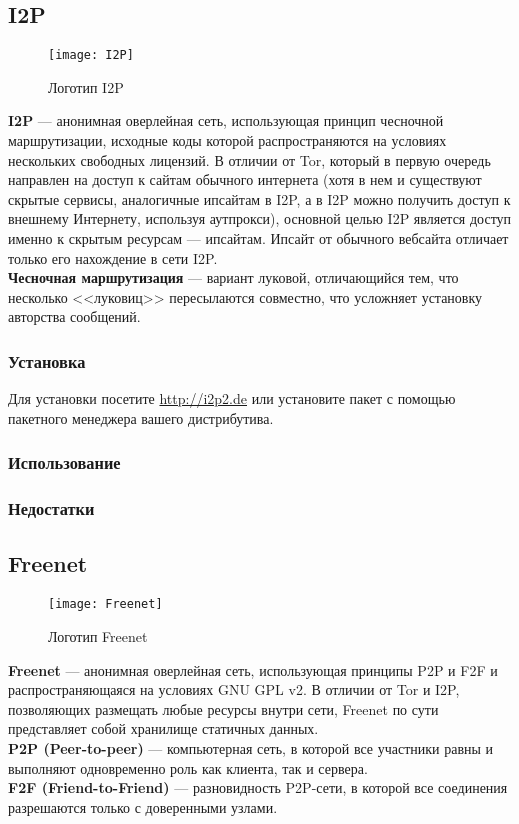 \subsection{I2P}
\begin{wrapfigure}[6]{r}{0.25\linewidth}
\texttt{[image: I2P]}
\caption{Логотип I2P}
\end{wrapfigure}
\textbf{I2P} --- анонимная оверлейная сеть, использующая принцип чесночной маршрутизации, исходные коды которой распространяются на условиях нескольких свободных лицензий\cite{i2p_license}. В отличии от Tor, который в первую очередь направлен на доступ к сайтам обычного интернета (хотя в нем и существуют скрытые сервисы, аналогичные ипсайтам в I2P, а в I2P можно получить доступ к внешнему Интернету, используя аутпрокси), основной целью I2P является доступ именно к скрытым ресурсам --- ипсайтам. Ипсайт от обычного вебсайта отличает только его нахождение в сети I2P.\\
\textbf{Чесночная маршрутизация} --- вариант луковой, отличающийся тем, что несколько <<луковиц>> пересылаются совместно, что усложняет установку авторства сообщений.
\subsubsection{Установка}
Для установки посетите \url{http://i2p2.de} или установите пакет с помощью пакетного менеджера вашего дистрибутива.
\subsubsection{Использование}
\subsubsection{Недостатки}
\subsection{Freenet}
\begin{wrapfigure}[9]{r}{0.25\linewidth}
\texttt{[image: Freenet]}
\caption{Логотип Freenet}
\end{wrapfigure}
\textbf{Freenet} --- анонимная оверлейная сеть, использующая принципы P2P и F2F и распространяющаяся на условиях GNU GPL v2\cite{freenet_license}. В отличии от Tor и I2P, позволяющих размещать любые ресурсы внутри сети, Freenet по сути представляет собой хранилище статичных данных.\\
\textbf{P2P (Peer-to-peer)} --- компьютерная сеть, в которой все участники равны и выполняют одновременно роль как клиента, так и сервера.\\
\textbf{F2F (Friend-to-Friend)} --- разновидность P2P-сети, в которой все соединения разрешаются только с доверенными узлами.
